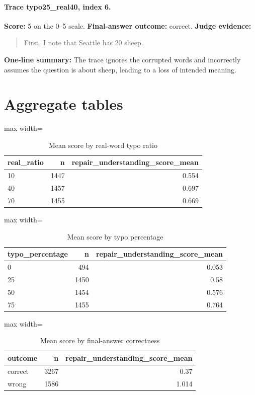 \documentclass[11pt]{article}
\begin{document}
\paragraph{Trace typo25\_real40, index 6.}
\textbf{Score:} 5 on the 0--5 scale. \textbf{Final-answer outcome:} correct.
\textbf{Judge evidence:} \begin{quote}First, I note that Seattle has 20 sheep.\end{quote}
\textbf{One-line summary:} The trace ignores the corrupted words and incorrectly assumes the question is about sheep, leading to a loss of intended meaning.\medskip

\section*{Aggregate tables}

\begin{table}[H]
\centering
\caption{Mean score by real-word typo ratio}
\small
\begin{adjustbox}{max width=\textwidth}
\begin{tabular}{lrr}
\toprule
\textbf{real\_ratio} & \textbf{n} & \textbf{repair\_understanding\_score\_mean} \\
\midrule
10 & 1447 & 0.554 \\
40 & 1457 & 0.697 \\
70 & 1455 & 0.669 \\
\bottomrule
\end{tabular}
\end{adjustbox}
\end{table}

\begin{table}[H]
\centering
\caption{Mean score by typo percentage}
\small
\begin{adjustbox}{max width=\textwidth}
\begin{tabular}{lrr}
\toprule
\textbf{typo\_percentage} & \textbf{n} & \textbf{repair\_understanding\_score\_mean} \\
\midrule
0 & 494 & 0.053 \\
25 & 1450 & 0.58 \\
50 & 1454 & 0.576 \\
75 & 1455 & 0.764 \\
\bottomrule
\end{tabular}
\end{adjustbox}
\end{table}

\begin{table}[H]
\centering
\caption{Mean score by final-answer correctness}
\small
\begin{adjustbox}{max width=\textwidth}
\begin{tabular}{lrr}
\toprule
\textbf{outcome} & \textbf{n} & \textbf{repair\_understanding\_score\_mean} \\
\midrule
correct & 3267 & 0.37 \\
wrong & 1586 & 1.014 \\
\bottomrule
\end{tabular}
\end{adjustbox}
\end{table}
\end{document}
